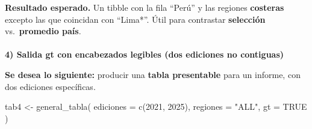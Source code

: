\documentclass[
  11pt,
  letterpaper,
  DIV=11,
  numbers=noendperiod]{scrartcl}
\makeatletter
\let\oldparagraph\paragraph
\renewcommand{\paragraph}{
    \@ifstar
      \xxxParagraphStar
      \xxxParagraphNoStar
  }
\newcommand{\xxxParagraphStar}[1]{\oldparagraph*{#1}\mbox{}}
\newcommand{\xxxParagraphNoStar}[1]{\oldparagraph{#1}\mbox{}}
\newenvironment{Shaded}{\begin{snugshade}}{\end{snugshade}}
\newcommand{\AttributeTok}[1]{\textcolor[rgb]{0.40,0.45,0.13}{#1}}
\newcommand{\ConstantTok}[1]{\textcolor[rgb]{0.56,0.35,0.01}{#1}}
\newcommand{\DecValTok}[1]{\textcolor[rgb]{0.68,0.00,0.00}{#1}}
\newcommand{\FunctionTok}[1]{\textcolor[rgb]{0.28,0.35,0.67}{#1}}
\newcommand{\NormalTok}[1]{\textcolor[rgb]{0.00,0.23,0.31}{#1}}
\newcommand{\OtherTok}[1]{\textcolor[rgb]{0.00,0.23,0.31}{#1}}
\newcommand{\StringTok}[1]{\textcolor[rgb]{0.13,0.47,0.30}{#1}}
\makeatother
\begin{document}
\textbf{Resultado esperado.} Un tibble con la fila ``Perú'' y las
regiones \textbf{costeras} excepto las que coincidan con ``Lima*''. Útil
para contrastar \textbf{selección} vs.~\textbf{promedio país}.

\paragraph{\texorpdfstring{\textbf{4) Salida gt con encabezados legibles
(dos ediciones no
contiguas)}}{4) Salida gt con encabezados legibles (dos ediciones no contiguas)}}\label{salida-gt-con-encabezados-legibles-dos-ediciones-no-contiguas}

\textbf{Se desea lo siguiente:} producir una \textbf{tabla presentable}
para un informe, con dos ediciones específicas.

\begin{Shaded}
\begin{Highlighting}[]
\NormalTok{tab4 }\OtherTok{\textless{}{-}} \FunctionTok{general\_tabla}\NormalTok{(}
  \AttributeTok{ediciones =} \FunctionTok{c}\NormalTok{(}\DecValTok{2021}\NormalTok{, }\DecValTok{2025}\NormalTok{),}
  \AttributeTok{regiones  =} \StringTok{"ALL"}\NormalTok{,}
  \AttributeTok{gt        =} \ConstantTok{TRUE}
\NormalTok{)}
\end{Highlighting}
\end{Shaded}
\end{document}
